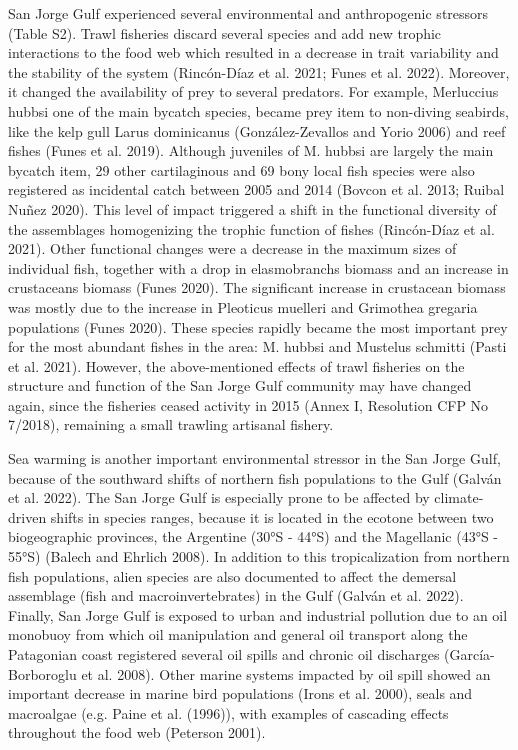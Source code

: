 \documentclass[
]{article}
\begin{document}
San Jorge Gulf experienced several environmental and anthropogenic
stressors (Table S2). Trawl fisheries discard several species and add
new trophic interactions to the food web which resulted in a decrease in
trait variability and the stability of the system (Rincón-Díaz et al.
2021; Funes et al. 2022). Moreover, it changed the availability of prey
to several predators. For example, Merluccius hubbsi one of the main
bycatch species, became prey item to non-diving seabirds, like the kelp
gull Larus dominicanus (González-Zevallos and Yorio 2006) and reef
fishes (Funes et al. 2019). Although juveniles of M. hubbsi are largely
the main bycatch item, 29 other cartilaginous and 69 bony local fish
species were also registered as incidental catch between 2005 and 2014
(Bovcon et al. 2013; Ruibal Nuñez 2020). This level of impact triggered
a shift in the functional diversity of the assemblages homogenizing the
trophic function of fishes (Rincón-Díaz et al. 2021). Other functional
changes were a decrease in the maximum sizes of individual fish,
together with a drop in elasmobranchs biomass and an increase in
crustaceans biomass (Funes 2020). The significant increase in crustacean
biomass was mostly due to the increase in Pleoticus muelleri and
Grimothea gregaria populations (Funes 2020). These species rapidly
became the most important prey for the most abundant fishes in the area:
M. hubbsi and Mustelus schmitti (Pasti et al. 2021). However, the
above-mentioned effects of trawl fisheries on the structure and function
of the San Jorge Gulf community may have changed again, since the
fisheries ceased activity in 2015 (Annex I, Resolution CFP No 7/2018),
remaining a small trawling artisanal fishery.

Sea warming is another important environmental stressor in the San Jorge
Gulf, because of the southward shifts of northern fish populations to
the Gulf (Galván et al. 2022). The San Jorge Gulf is especially prone to
be affected by climate-driven shifts in species ranges, because it is
located in the ecotone between two biogeographic provinces, the
Argentine (30°S - 44°S) and the Magellanic (43°S - 55°S) (Balech and
Ehrlich 2008). In addition to this tropicalization from northern fish
populations, alien species are also documented to affect the demersal
assemblage (fish and macroinvertebrates) in the Gulf (Galván et al.
2022). Finally, San Jorge Gulf is exposed to urban and industrial
pollution due to an oil monobuoy from which oil manipulation and general
oil transport along the Patagonian coast registered several oil spills
and chronic oil discharges (García-Borboroglu et al. 2008). Other marine
systems impacted by oil spill showed an important decrease in marine
bird populations (Irons et al. 2000), seals and macroalgae (e.g. Paine
et al. (1996)), with examples of cascading effects throughout the food
web (Peterson 2001).
\end{document}
